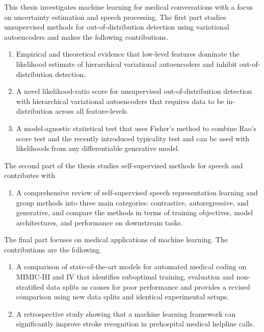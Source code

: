 This thesis investigates machine learning for medical conversations with a focus on uncertainty estimation and speech processing. 
The first part studies unsupervised methods for out-of-distribution detection using variational autoencoders and makes the following contributions. 
%
\begin{enumerate}[label=(\roman*)] 
    \item Empirical and theoretical evidence that low-level features dominate the likelihood estimate of hierarchical variational autoencoders and inhibit out-of-distribution detection.
    \item A novel likelihood-ratio score for unsupervised out-of-distribution detection with hierarchical variational autoencoders that requires data to be in-distribution across all feature-levels. 
    \item A model-agnostic statistical test that uses Fisher's method to combine Rao's score test and the recently introduced typicality test and can be used with likelihoods from any differentiable generative model. 
\end{enumerate}
%
The second part of the thesis studies self-supervised methods for speech and contributes with
\begin{enumerate}[resume, label=(\roman*)] 
    \item A comprehensive review of self-supervised speech representation learning and group methods into three main categories: contrastive, autoregressive, and generative, and compare the methods in terms of training objectives, model architectures, and performance on downstream tasks.
\end{enumerate}
%
The final part focuses on medical applications of machine learning. The contributions are the following.
%
\begin{enumerate}[resume, label=(\roman*)] 
    \item A comparison of state-of-the-art models for automated medical coding on MIMIC-III and IV that identifies suboptimal training, evaluation and non-stratified data splits as causes for poor performance and provides a revised comparison using new data splits and identical experimental setups. 
    \item A retrospective study showing that a machine learning framework can significantly improve stroke recognition in prehospital medical helpline calls. 
\end{enumerate}
%
